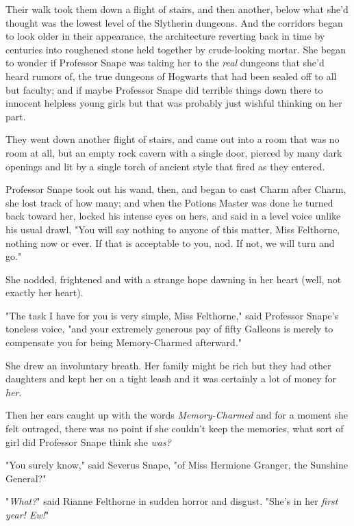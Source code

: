 Their walk took them down a flight of stairs, and then another, below what
she'd thought was the lowest level of the Slytherin dungeons. And the corridors
began to look older in their appearance, the architecture reverting back in
time by centuries into roughened stone held together by crude-looking mortar.
She began to wonder if Professor Snape was taking her to the \emph{real}
dungeons that she'd heard rumors of, the true dungeons of Hogwarts that had
been sealed off to all but faculty; and if maybe Professor Snape did terrible
things down there to innocent helpless young girls but that was probably just
wishful thinking on her part.

They went down another flight of stairs, and came out into a room that was no
room at all, but an empty rock cavern with a single door, pierced by many dark
openings and lit by a single torch of ancient style that fired as they entered.

Professor Snape took out his wand, then, and began to cast Charm after Charm,
she lost track of how many; and when the Potions Master was done he turned back
toward her, locked his intense eyes on hers, and said in a level voice unlike
his usual drawl, "You will say nothing to anyone of this matter, Miss
Felthorne, nothing now or ever. If that is acceptable to you, nod. If not, we
will turn and go."

She nodded, frightened and with a strange hope dawning in her heart (well, not
exactly her heart).

"The task I have for you is very simple, Miss Felthorne," said Professor
Snape's toneless voice, "and your extremely generous pay of fifty Galleons is
merely to compensate you for being Memory-Charmed afterward."

She drew an involuntary breath. Her family might be rich but they had other
daughters and kept her on a tight leash and it was certainly a lot of money for
\emph{her}.

Then her ears caught up with the words \emph{Memory-Charmed} and for a moment
she felt outraged, there was no point if she couldn't keep the memories, what
sort of girl did Professor Snape think she \emph{was?}

"You surely know," said Severus Snape, "of Miss Hermione Granger, the Sunshine
General?"

"\emph{What?}" said Rianne Felthorne in sudden horror and disgust. "She's in
her \emph{first year! Ew!}"
